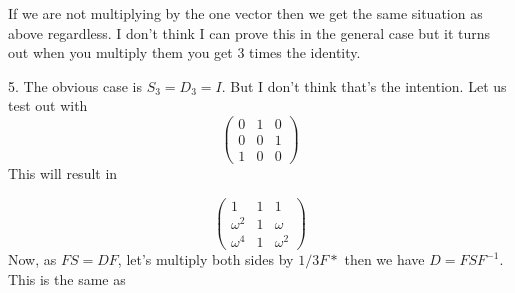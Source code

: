 \documentclass{article}
\begin{document}
If we are not multiplying by the one vector then we get the same situation as above regardless. I don't think I can prove this in the general case but it turns out when you multiply them you get 3 times the identity.

5. The obvious case is $S_3=D_3=I$. But I don't think that's the intention.
Let us test out with
\begin{equation}
	\begin{pmatrix}
		0 & 1 & 0 \\
		0 & 0 & 1 \\
		1 & 0 & 0
	\end{pmatrix}
\end{equation}
This will result in

\begin{equation}
	\begin{pmatrix}
		1 & 1 & 1 \\
		\omega^2 & 1 & \omega \\
		\omega^4 & 1 & \omega^2
	\end{pmatrix}
\end{equation}
Now, as $FS=DF$, let's multiply both sides by $1/3F*$ then we have
$D=FSF^{-1}$. This is the same as
\end{document}
